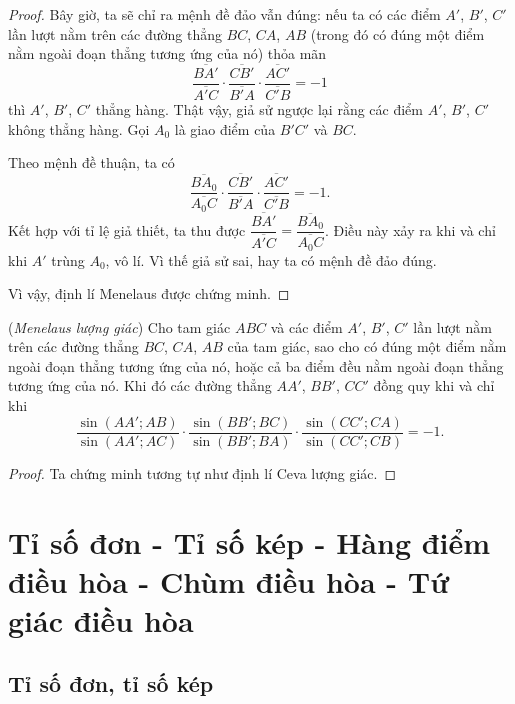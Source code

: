 \documentclass{article} %
\begin{document}
\begin{proof}
            Bây giờ, ta sẽ chỉ ra mệnh đề đảo vẫn đúng: nếu ta có các điểm \(A'\), \(B'\), \(C'\) lần lượt nằm trên các đường thẳng \(BC\), \(CA\), \(AB\) (trong đó có đúng một điểm nằm ngoài đoạn thẳng tương ứng của nó) thỏa mãn
            \[\frac{\overline{BA'}}{\overline{A'C}} \cdot \frac{\overline{CB'}}{\overline{B'A}} \cdot \frac{\overline{AC'}}{\overline{C'B}} = -1\]
            thì \(A'\), \(B'\), \(C'\) thẳng hàng. Thật vậy, giả sử ngược lại rằng các điểm \(A'\), \(B'\), \(C'\) không thẳng hàng. Gọi \(A_0\) là giao điểm của \(B'C'\) và \(BC\).

            Theo mệnh đề thuận, ta có
            \[\frac{\overline{BA_0}}{\overline{A_0C}} \cdot \frac{\overline{CB'}}{\overline{B'A}} \cdot \frac{\overline{AC'}}{\overline{C'B}} = -1.\]
            Kết hợp với tỉ lệ giả thiết, ta thu được \(\dfrac{\overline{BA'}}{\overline{A'C}} = \dfrac{\overline{BA_0}}{\overline{A_0C}}\). Điều này xảy ra khi và chỉ khi \(A'\) trùng \(A_0\), vô lí. Vì thế giả sử sai, hay ta có mệnh đề đảo đúng.

            Vì vậy, định lí Menelaus được chứng minh.
        \end{proof}

        \begin{theorem}
            (\textit{Menelaus lượng giác}) Cho tam giác \(ABC\) và các điểm \(A'\), \(B'\), \(C'\) lần lượt nằm trên các đường thẳng \(BC\), \(CA\), \(AB\) của tam giác, sao cho có đúng một điểm nằm ngoài đoạn thẳng tương ứng của nó, hoặc cả ba điểm đều nằm ngoài đoạn thẳng tương ứng của nó. Khi đó các đường thẳng \(AA'\), \(BB'\), \(CC'\) đồng quy khi và chỉ khi
            \[\frac{\sin (AA';AB)}{\sin (AA';AC)} \cdot \frac{\sin (BB';BC)}{\sin (BB';BA)} \cdot \frac{\sin (CC';CA)}{\sin (CC';CB)} = -1.\]
        \end{theorem}

        \begin{proof}
            Ta chứng minh tương tự như định lí Ceva lượng giác.
        \end{proof}

\section{Tỉ số đơn - Tỉ số kép - Hàng điểm điều hòa - Chùm điều hòa - Tứ giác điều hòa}

    \subsection{Tỉ số đơn, tỉ số kép}
\end{document}
